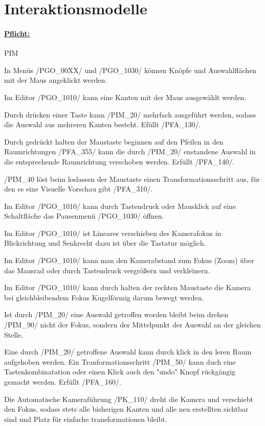 %
%


%
%
\clearpage


\section{Interaktionsmodelle}
\label{NU:Interaktion}


\paragraph*{\underline{Pflicht:}}

\begin{ids}{\gls{PIM}}

	\id[10] In Menüs /PGO\_00XX/ und /PGO\_1030/ können Knöpfe und Auswahlflächen mit der Maus angeklickt werden.
	
	\id[20] Im Editor /PGO\_1010/ kann eine Kanten mit der Maus ausgewählt werden.
	
	\id[30] Durch drücken einer Taste kann /PIM\_20/ mehrfach ausgeführt werden, sodass die Auswahl aus mehreren Kanten besteht. Efüllt /PFA\_130/.
	
	\id[40] Durch gedrückt halten der Maustaste beginnen auf den Pfeilen in den Raumrichtungen /PFA\_355/ kann die durch /PIM\_20/ enstandene Auswahl in die entsprechende Raumrichtung verschoben werden. Erfüllt /PFA\_140/.
	
	\id[50] /PIM\_40 löst beim loslassen der Maustaste einen Transformationsschritt aus, für den es eine Visuelle Vorschau gibt /PFA\_310/.
	
	\id[60] Im Editor /PGO\_1010/ kann durch Tastendruck oder Mausklick auf eine Schaltfläche das Pausenmenü /PGO\_1030/ öffnen.
	
	\id[70] Im Editor /PGO\_1010/ ist Lineares verschieben des Kamerafokus in Blickrichtung und Senkrecht dazu ist über die Tastatur möglich.
	
	\id[80] Im Editor /PGO\_1010/ kann man den Kamerabstand zum Fokus (Zoom) über das Mausrad oder durch Tastendruck vergrößern und verkleinern.
	
	\id[90] Im Editor /PGO\_1010/ kann durch halten der rechten Maustaste die Kamera bei gleichbleibendem Fokus Kugelförmig darum bewegt werden.
	
	\id[100] Ist durch /PIM\_20/ eine Auswahl getroffen worden bleibt beim drehen /PIM\_90/ nicht der Fokus, sondern der Mittelpunkt der Auswahl an der gleichen Stelle.
	
	\id[110] Eine durch /PIM\_20/ getroffene Auswahl kann durch klick in den leren Raum aufgehoben werden.
	\id[120] Ein Tranformationsschritt /PIM\_50/ kann duch eine Tastenkombinatation oder einen Klick auch den "undo" Knopf rückgängig gemacht werden. Erfüllt /PFA\_160/.
	
	\id[130] Die Automatische Kameraführung /PK\_110/ dreht die Kamera und verschiebt den Fokus, sodass stets alle bisherigen Kanten und alle neu erstellten sichtbar sind und Platz für einfache transformationen bleibt.

\end{ids}


